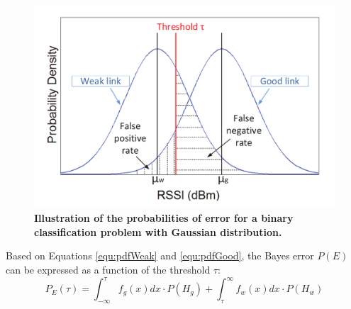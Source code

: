 \begin{figure}
	\centering
	\includegraphics[width=1\linewidth]{rssi-threshold}
	\vspace{-0.8cm}
	\caption{\textbf{Illustration of the probabilities of error for a binary classification problem with Gaussian distribution.}}
	\label{fig:rssi-threshold}
	\vspace{-0.8cm}
\end{figure}

Based on Equations \ref{equ:pdfWeak} and \ref{equ:pdfGood}, the Bayes error $P(E)$ can be expressed as a function of the threshold $\tau$:
\begin{equation} \label{equ:fpr}
	P_E(\tau) = \int_{-\infty}^{\tau} f_g(x) dx \cdot P(H_g) + \int_{\tau}^{\infty} f_w(x) dx \cdot P(H_w)
\end{equation}



